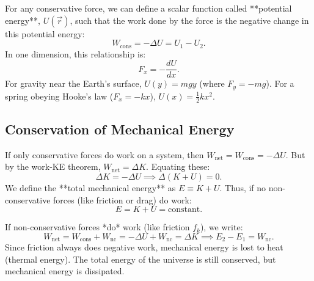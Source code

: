For any conservative force, we can define a scalar function called **potential energy**, $U(\vec{r})$, such that the work done by the force is the negative change in this potential energy:
\begin{equation}
    W_{\text{cons}} = -\Delta U = U_1 - U_2.
\end{equation}
In one dimension, this relationship is:
\begin{equation}
    F_x = -\frac{dU}{dx}.
\end{equation}
For gravity near the Earth's surface, $U(y) = mgy$ (where $F_y = -mg$). For a spring obeying Hooke's law ($F_x = -kx$), $U(x) = \frac{1}{2}kx^2$.

\subsection{Conservation of Mechanical Energy}

If only conservative forces do work on a system, then $W_{\text{net}} = W_{\text{cons}} = -\Delta U$. But by the work-KE theorem, $W_{\text{net}} = \Delta K$. Equating these:
\begin{equation}
    \Delta K = -\Delta U \implies \Delta(K + U) = 0.
\end{equation}
We define the **total mechanical energy** as $E \equiv K + U$. Thus, if no non-conservative forces (like friction or drag) do work:
\begin{equation}
    E = K + U = \text{constant}.
\end{equation}

If non-conservative forces *do* work (like friction $f_k$), we write:
\begin{equation}
    W_{\text{net}} = W_{\text{cons}} + W_{\text{nc}} = -\Delta U + W_{\text{nc}} = \Delta K \implies E_2 - E_1 = W_{\text{nc}}.
\end{equation}
Since friction always does negative work, mechanical energy is lost to heat (thermal energy). The total energy of the universe is still conserved, but mechanical energy is dissipated.

